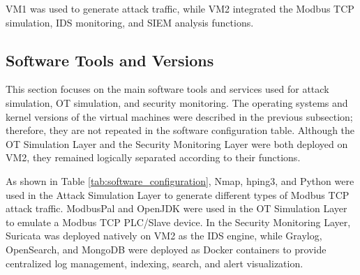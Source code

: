 VM1 was used to generate attack traffic, while VM2 integrated the Modbus TCP simulation, IDS monitoring, and SIEM analysis functions.

\newpage

\subsection{Software Tools and Versions}
This section focuses on the main software tools and services used for attack
simulation, OT simulation, and security monitoring. The operating systems and
kernel versions of the virtual machines were described in the previous subsection;
therefore, they are not repeated in the software configuration table. Although the
OT Simulation Layer and the Security Monitoring Layer were both deployed on
VM2, they remained logically separated according to their functions.

As shown in Table \ref{tab:software_configuration}, Nmap, hping3, and Python were used in the Attack
Simulation Layer to generate different types of Modbus TCP attack traffic.
ModbusPal and OpenJDK were used in the OT Simulation Layer to emulate a
Modbus TCP PLC/Slave device. In the Security Monitoring Layer, Suricata was
deployed natively on VM2 as the IDS engine, while Graylog, OpenSearch, and
MongoDB were deployed as Docker containers to provide centralized log
management, indexing, search, and alert visualization.

